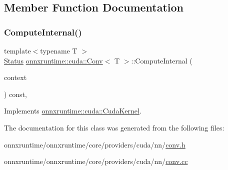 \subsection{Member Function Documentation}
\mbox{\label{classonnxruntime_1_1cuda_1_1Conv_a01a9b9a3a511fe197e7bb92685f50e8e}} 
\subsubsection{\texorpdfstring{Compute\+Internal()}{ComputeInternal()}}
{\footnotesize\ttfamily template$<$typename T $>$ \\
\mbox{\hyperlink{classonnxruntime_1_1common_1_1Status}{Status}} \mbox{\hyperlink{classonnxruntime_1_1cuda_1_1Conv}{onnxruntime\+::cuda\+::\+Conv}}$<$ T $>$\+::Compute\+Internal (\begin{DoxyParamCaption}\item[{\mbox{\hyperlink{classonnxruntime_1_1OpKernelContext}{Op\+Kernel\+Context}} $\ast$}]{context }\end{DoxyParamCaption}) const\hspace{0.3cm}{\ttfamily [override]}, {\ttfamily [virtual]}}



Implements \mbox{\hyperlink{classonnxruntime_1_1cuda_1_1CudaKernel_aca7af04ae448017d6023d30bba231ebb}{onnxruntime\+::cuda\+::\+Cuda\+Kernel}}.



The documentation for this class was generated from the following files\+:\begin{DoxyCompactItemize}
\item 
onnxruntime/onnxruntime/core/providers/cuda/nn/\mbox{\hyperlink{cuda_2nn_2conv_8h}{conv.\+h}}\item 
onnxruntime/onnxruntime/core/providers/cuda/nn/\mbox{\hyperlink{cuda_2nn_2conv_8cc}{conv.\+cc}}\end{DoxyCompactItemize}
